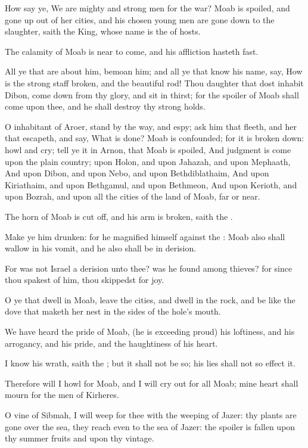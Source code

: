 \Verse How say ye, We are mighty and strong men for the war?  \Verse Moab is spoiled, and gone up out of her cities, and his chosen young men are gone down to the slaughter, saith the King, whose name is the \LORD of hosts.

\Verse The calamity of Moab is near to come, and his affliction hasteth fast.

\Verse All ye that are about him, bemoan him; and all ye that know his name, say, How is the strong staff broken, and the beautiful rod!  \Verse Thou daughter that dost inhabit Dibon, come down from thy glory, and sit in thirst; for the spoiler of Moab shall come upon thee, and he shall destroy thy strong holds.

\Verse O inhabitant of Aroer, stand by the way, and espy; ask him that fleeth, and her that escapeth, and say, What is done?  \Verse Moab is confounded; for it is broken down: howl and cry; tell ye it in Arnon, that Moab is spoiled, \Verse And judgment is come upon the plain country; upon Holon, and upon Jahazah, and upon Mephaath, \Verse And upon Dibon, and upon Nebo, and upon Bethdiblathaim, \Verse And upon Kiriathaim, and upon Bethgamul, and upon Bethmeon, \Verse And upon Kerioth, and upon Bozrah, and upon all the cities of the land of Moab, far or near.

\Verse The horn of Moab is cut off, and his arm is broken, saith the \LORD.

\Verse Make ye him drunken: for he magnified himself against the \LORD: Moab also shall wallow in his vomit, and he also shall be in derision.

\Verse For was not Israel a derision unto thee? was he found among thieves?  for since thou spakest of him, thou skippedst for joy.

\Verse O ye that dwell in Moab, leave the cities, and dwell in the rock, and be like the dove that maketh her nest in the sides of the hole's mouth.

\Verse We have heard the pride of Moab, (he is exceeding proud) his loftiness, and his arrogancy, and his pride, and the haughtiness of his heart.

\Verse I know his wrath, saith the \LORD; but it shall not be so; his lies shall not so effect it.

\Verse Therefore will I howl for Moab, and I will cry out for all Moab; mine heart shall mourn for the men of Kirheres.

\Verse O vine of Sibmah, I will weep for thee with the weeping of Jazer: thy plants are gone over the sea, they reach even to the sea of Jazer: the spoiler is fallen upon thy summer fruits and upon thy vintage.

